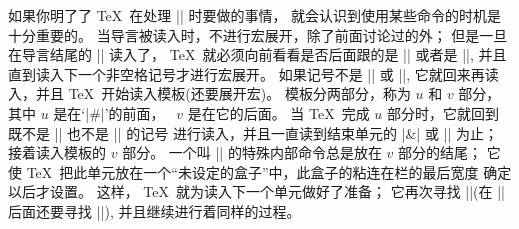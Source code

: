 {{%
\ddanger 如果你明了了 \TeX\ 在处理 |\halign| 时要做的事情，
就会认识到使用某些命令的时机是十分重要的。%
当导言被读入时，不进行宏展开，除了前面讨论过的外；
但是一旦在导言结尾的 |\cr| 读入了，
 \TeX\ 就必须向前看看是否后面跟的是 |\noalign| 或者是 |\omit|,
并且直到读入下一个非空格记号才进行宏展开。%
如果记号不是 |\noalign| 或 |\omit|,
它就回来再读入，并且 \TeX\ 开始读入模板(还要展开宏)。%
模板分两部分，称为 $u$ 和 $v$ 部分，其中 $u$ 是在`|#|'的前面，
~$v$ 是在它的后面。%
当 \TeX\ 完成 $u$ 部分时，它就回到既不是 |\noalign| 也不是 |\omit| 的记号%
进行读入，并且一直读到结束单元的 |&| 或 |\cr| 为止；
接着读入模板的 $v$ 部分。%
一个叫 |\endtemplate| 的特殊内部命令总是放在 $v$ 部分的结尾；
它使 \TeX\ 把此单元放在一个``未设定的盒子''中，此盒子的粘连在栏的最后宽度%
确定以后才设置。%
这样， \TeX\ 就为读入下一个单元做好了准备；
它再次寻找 |\omit|(在 |\cr| 后面还要寻找 |\noalign|),
并且继续进行着同样的过程。

}}
